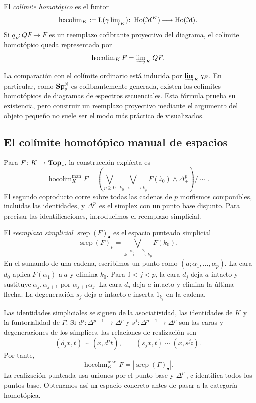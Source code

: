\begin{defi}
El \emph{colímite homotópico} es el funtor
\[
\operatorname{hocolim}_K:=\mathrm L(\gamma\varinjlim\nolimits_K)\colon
\operatorname{Ho}(\mathcal M^K)\longrightarrow\operatorname{Ho}(\mathcal M).
\]
Si $q_F\colon QF\to F$ es un reemplazo cofibrante proyectivo del diagrama, el colímite homotópico queda representado por
\[
\operatorname{hocolim}_KF=\varinjlim\nolimits_KQF.
\]
\end{defi}
La comparación con el colímite ordinario está inducida por $\varinjlim\nolimits_Kq_F$. En particular, como $\mathbf{Sp}^{\mathbb N}_s$ es cofibrantemente generada, existen los colímites homotópicos de diagramas de espectros secuenciales. Esta fórmula prueba su existencia, pero construir un reemplazo proyectivo mediante el argumento del objeto pequeño no suele ser el modo más práctico de visualizarlos.

\subsection{El colímite homotópico manual de espacios}

Para $F\colon K\to\mathbf{Top}_*$, la construcción explícita es
\[
\operatorname{hocolim}^{\mathrm{man}}_KF
=\left(\bigvee_{p\ge0}\ \bigvee_{k_0\to\cdots\to k_p}
F(k_0)\wedge\Delta^p_+\right)/{\sim}.
\]
El segundo coproducto corre sobre todas las cadenas de $p$ morfismos componibles, incluidas las identidades, y $\Delta^p_+$ es el simplex con un punto base disjunto. Para precisar las identificaciones, introducimos el reemplazo simplicial.

\begin{defi}
El \emph{reemplazo simplicial} $\operatorname{srep}(F)_\bullet$ es el espacio punteado simplicial
\[
\operatorname{srep}(F)_p=\bigvee_{k_0\xrightarrow{\alpha_1}\cdots\xrightarrow{\alpha_p}k_p}F(k_0).
\]
En el sumando de una cadena, escribimos un punto como $(a;\alpha_1,\ldots,\alpha_p)$. La cara $d_0$ aplica $F(\alpha_1)$ a $a$ y elimina $k_0$. Para $0<j<p$, la cara $d_j$ deja $a$ intacto y sustituye $\alpha_j,\alpha_{j+1}$ por $\alpha_{j+1}\alpha_j$. La cara $d_p$ deja $a$ intacto y elimina la última flecha. La degeneración $s_j$ deja $a$ intacto e inserta $1_{k_j}$ en la cadena.
\end{defi}
Las identidades simpliciales se siguen de la asociatividad, las identidades de $K$ y la funtorialidad de $F$. Si $d^j\colon\Delta^{p-1}\to\Delta^p$ y $s^j\colon\Delta^{p+1}\to\Delta^p$ son las caras y degeneraciones de los símplices, las relaciones de realización son
\[
(d_jx,t)\sim(x,d^jt),\qquad
(s_jx,t)\sim(x,s^jt).
\]
Por tanto,
\[
\operatorname{hocolim}^{\mathrm{man}}_KF=|\operatorname{srep}(F)_\bullet|.
\]
La realización punteada usa uniones por el punto base y $\Delta^p_+$, e identifica todos los puntos base. Obtenemos así un espacio concreto antes de pasar a la categoría homotópica.

